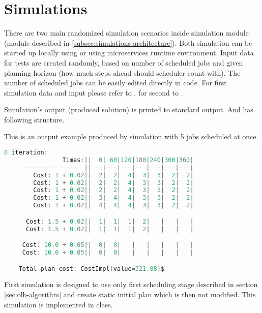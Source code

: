 \section{Simulations}\label{sec:simulations}

There are two main randomized simulation scenarios inside simulation module 
(module described in \ref{subsec:simulations-architecture}).
Both simulation can be started up locally using  or
using  microservices runtime environment.
Input data for tests are created randomly,
based on number of scheduled jobs and given planning horizon (how much steps ahead should scheduler count with).
The number of scheduled jobs can be easily edited directly in code.
For first simulation data and input please refer to ,
for second to .

Simulation's output (produced solution) is printed to standard output.
And has following structure.

This is an output example produced by simulation with 5 jobs scheduled at once.
\medskip
\begin{samepage}
\begin{lstlisting}[language=Kotlin]
    0 iteration:
                Times:||  0| 60|120|180|240|300|360|
    ----------------- || --|---|---|---|---|---|---|
        Cost: 1 + 0.02||  2|  2|  4|  3|  3|  2|  2|
        Cost: 1 + 0.02||  2|  2|  4|  3|  3|  2|  2|
        Cost: 1 + 0.02||  2|  2|  4|  3|  3|  2|  2|
        Cost: 1 + 0.02||  3|  4|  4|  3|  3|  2|  2|
        Cost: 1 + 0.02||  4|  4|  4|  3|  3|  2|  2|

      Cost: 1.5 + 0.02||  1|  1|  1|  2|   |   |   |
      Cost: 1.5 + 0.02||  1|  1|  1|  2|   |   |   |

     Cost: 10.0 + 0.05||  0|  0|   |   |   |   |   |
     Cost: 10.0 + 0.05||  0|  0|   |   |   |   |   |

    Total plan cost: CostImpl(value=321.08)$
\end{lstlisting}
\end{samepage}

First simulation is designed to use only first scheduling stage described in section \ref{sec:olb-algorithm}
and create static initial plan which is then not modified.
This simulation is implemented in  class.
